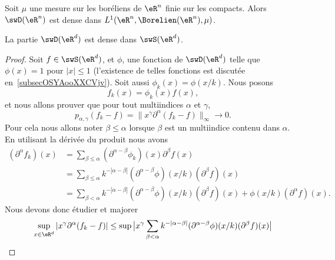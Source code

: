 \begin{theorem}      \label{ThoRWEoqY}
	Soit \( \mu\) une mesure sur les boréliens de \( \eR^n\) finie sur les compacts. Alors \( \swD(\eR^n)\) est dense dans \( L^1(\eR^n,\Borelien(\eR^n),\mu)\).
\end{theorem}

\begin{proposition}      \label{PROPooJNQZooIRbJei}
	La partie \( \swD(\eR^d)\) est dense dans \( \swS(\eR^d)\).
\end{proposition}

\begin{proof}
	Soit \( f\in \swS(\eR^d)\), et \( \phi\), une fonction de \( \swD(\eR^d)\) telle que \( \phi(x)=1\) pour \(| x |\leq 1 \) (l'existence de telles fonctions est discutée en~\ref{subsecOSYAooXXCVjv}). Soit aussi \( \phi_k(x)=\phi(x/k)\). Nous posons
	\begin{equation}
		f_k(x)=\phi_k(x)f(x),
	\end{equation}
	et nous allons prouver que pour tout multiindices \( \alpha\) et \( \gamma\),
	\begin{equation}
		p_{\alpha,\gamma}(f_k-f)=\| x^{\gamma}\partial^{\alpha}(f_k-f)  \|_{\infty}\to 0.
	\end{equation}
	Pour cela nous allons noter \(  \beta\leq \alpha  \) lorsque \( \beta\) est un multiindice contenu dans \( \alpha\). En utilisant la dérivée du produit nous avons
	\begin{subequations}
		\begin{align}
			(\partial^{\alpha}f_k)(x) & =\sum_{\beta\leq \alpha}(\partial^{\alpha-\beta}\phi_k)(x)\partial^{\beta}f(x)                                                         \\
			                          & =\sum_{\beta\leq \alpha}k^{-| \alpha-\beta |}(\partial^{\alpha-\beta}\phi)(x/k)(\partial^{\beta}f)(x)                                  \\
			                          & =\sum_{\beta< \alpha}k^{-| \alpha-\beta |}(\partial^{\alpha-\beta}\phi)(x/k)(\partial^{\beta}f)(x) + \phi(x/k)(\partial^{\alpha}f)(x).
		\end{align}
	\end{subequations}
	Nous devons donc étudier et majorer
	\begin{equation}
		\begin{aligned}[]
			\sup_{x\in \eR^d}| x^{\gamma}\partial^{\alpha}(f_k-f) | & \leq \sup\big| x^{\gamma}  \sum_{\beta< \alpha}k^{-| \alpha-\beta |}(\partial^{\alpha-\beta}\phi)(x/k)(\partial^{\beta}f)(x)  \big| \\

\end{aligned}
\end{equation}
\end{proof}
